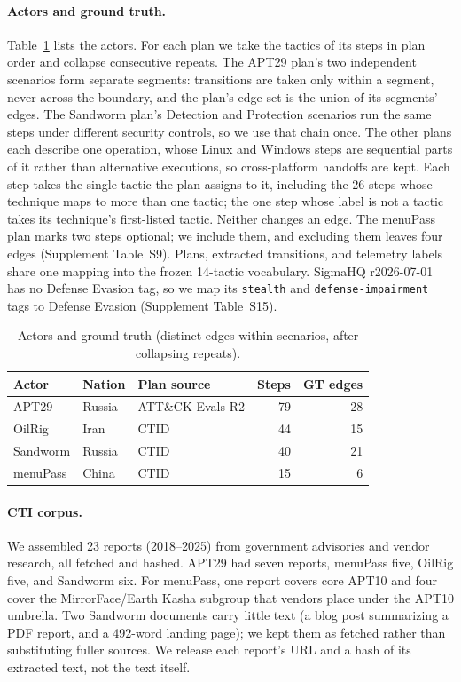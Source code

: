 \documentclass[letterpaper]{article}
\newif\ifflags
\newcommand{\flag}[1]{\ifflags\textcolor{red}{\textsuperscript{\textbf{[#1]}}}\fi}
\begin{document}
\paragraph{Actors and ground truth.} Table~\ref{tab:actors} lists the actors. For each plan we take the tactics of its steps in plan order and collapse consecutive repeats. The APT29 plan's two independent scenarios form separate segments: transitions are taken only within a segment, never across the boundary, and the plan's edge set is the union of its segments' edges. The Sandworm plan's Detection and Protection scenarios run the same steps under different security controls, so we use that chain once. The other plans each describe one operation, whose Linux and Windows steps are sequential parts of it rather than alternative executions, so cross-platform handoffs are kept. Each step takes the single tactic the plan assigns to it, including the 26 steps whose technique maps to more than one tactic; the one step whose label is not a tactic takes its technique's first-listed tactic. Neither changes an edge. The menuPass plan marks two steps optional; we include them, and excluding them leaves four edges (Supplement Table~S9). Plans, extracted transitions, and telemetry labels share one mapping into the frozen 14-tactic vocabulary. SigmaHQ r2026-07-01 has no Defense Evasion tag, so we map its \texttt{stealth} and \texttt{defense-impairment} tags to Defense Evasion (Supplement Table~S15).

\begin{table}[t]
\centering
\small
\begin{tabular}{@{}lllrr@{}}
\toprule
Actor & Nation & Plan source & Steps & GT edges \\
\midrule
APT29 & Russia & ATT\&CK Evals R2 & 79 & 28 \\
OilRig & Iran & CTID & 44 & 15 \\
Sandworm & Russia & CTID & 40 & 21 \\
menuPass & China & CTID & 15 & 6 \\
\bottomrule
\end{tabular}
\caption{Actors and ground truth (distinct edges within scenarios, after collapsing repeats).}
\label{tab:actors}
\end{table}

\paragraph{CTI corpus.} We assembled 23 reports (2018--2025) from government advisories and vendor research, all fetched and hashed. APT29 had seven reports, menuPass five, OilRig five, and Sandworm six. For menuPass, one report covers core APT10 and four cover the MirrorFace/Earth Kasha subgroup that vendors place under the APT10 umbrella.\flag{F6} Two Sandworm documents carry little text (a blog post summarizing a PDF report, and a 492-word landing page); we kept them as fetched rather than substituting fuller sources. We release each report's URL and a hash of its extracted text, not the text itself.
\end{document}
